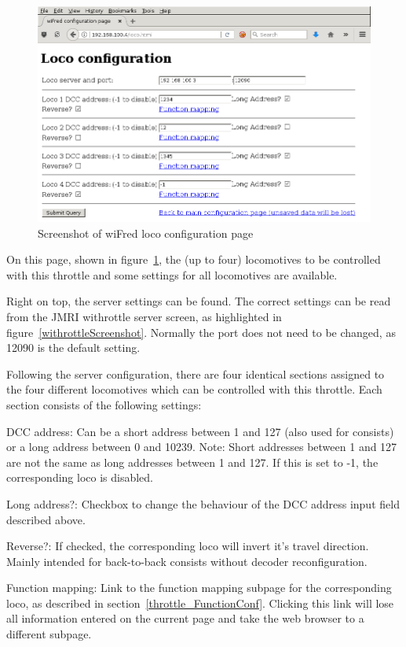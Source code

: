 \documentclass[11pt,a4paper]{scrartcl}
\begin{document}
\begin{figure}[tbh]
  \centering
  \includegraphics[width=0.8 \textwidth]{images/screenShot_loco}
  \caption{Screenshot of wiFred loco configuration page}
  \label{throttleConfigLocoPage}
\end{figure}

On this page, shown in figure~\ref{throttleConfigLocoPage}, the (up to four) locomotives to be controlled with this throttle and some settings for all locomotives are available.

Right on top, the server settings can be found. The correct settings can be read from the JMRI withrottle server screen, as highlighted in figure~\ref{withrottleScreenshot}. Normally the port does not need to be changed, as 12090 is the default setting.

Following the server configuration, there are four identical sections assigned to the four different locomotives which can be controlled with this throttle. Each section consists of the following settings:

\begin{description}
\item{DCC address:} Can be a short address between 1 and 127 (also used for consists) or a long address between 0 and 10239. Note: Short addresses between 1 and 127 are not the same as long addresses between 1 and 127. If this is set to -1, the corresponding loco is disabled.
\item{Long address?:} Checkbox to change the behaviour of the DCC address input field described above.
\item{Reverse?:} If checked, the corresponding loco will invert it's travel direction. Mainly intended for back-to-back consists without decoder reconfiguration.
\item{Function mapping:} Link to the function mapping subpage for the corresponding loco, as described in section~\ref{throttle_FunctionConf}. Clicking this link will lose all information entered on the current page and take the web browser to a different subpage.
\end{description}
\end{document}
